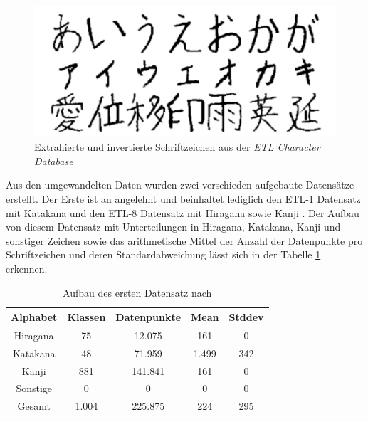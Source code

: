 \documentclass[twoside,a4paper]{IEEEtran}
\begin{document}
\begin{figure}[!htb]
	\includegraphics[width=\columnwidth]{kana}
	\caption{Extrahierte und invertierte Schriftzeichen aus der \emph{ETL Character Database} \cite[S.1]{RHC}}
	\label{kana}
\end{figure}

Aus den umgewandelten Daten wurden zwei verschieden aufgebaute Datensätze erstellt. Der Erste ist an \cite{RHC} angelehnt und beinhaltet lediglich den ETL-1 Datensatz mit Katakana und den ETL-8 Datensatz mit Hiragana sowie Kanji \cite[S.3]{RHC}. Der Aufbau von diesem Datensatz mit Unterteilungen in Hiragana, Katakana, Kanji und sonstiger Zeichen sowie das arithmetische Mittel der Anzahl der Datenpunkte pro Schriftzeichen und deren Standardabweichung lässt sich in der Tabelle \ref{data_tsai} erkennen.
\begin{table}[!htb]
	\caption{Aufbau des ersten Datensatz nach \cite{RHC}}
	\label{data_tsai}
	\centering
	\begin{tabular}{|c|c|c|c|c|}
		\hline
		Alphabet & Klassen & Datenpunkte & Mean & Stddev\\
		\hline
		\hline
		Hiragana & 75 & 12.075 & 161 & 0\\
		\hline 
		Katakana & 48 & 71.959 & 1.499 & 342\\
		\hline
		Kanji & 881 & 141.841 & 161 & 0\\
		\hline
		Sonstige & 0 & 0 & 0 & 0\\
		\hline
		\hline
		Gesamt & 1.004 & 225.875 & 224 & 295\\
		\hline
	\end{tabular}
\end{table}
\end{document}

